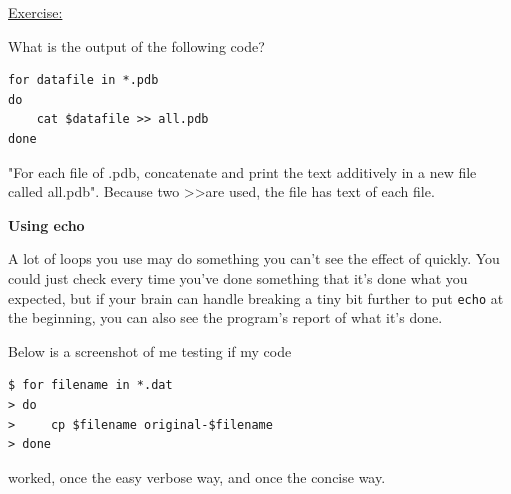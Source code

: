 \documentclass[12pt]{article}
\begin{document}
\begin{addmargin}[1cm]{0cm}
\color{gray}
\vspace{1em}\underline{Exercise:}

What is the output of the following code?
\vspace{-1em}\begin{verbatim}
for datafile in *.pdb
do
    cat $datafile >> all.pdb
done
\end{verbatim}\vspace{-0.5em}

\color{black}
"For each file of .pdb, concatenate and print the text additively in a new file called all.pdb". Because two \textgreater\textgreater are used, the file has text of each file. 
\end{addmargin}

\textbf{Using echo}

A lot of loops you use may do something you can't see the effect of quickly. You could just check every time you've done something that it's done what you expected, but if your brain can handle breaking a tiny bit further to put \texttt{echo} at the beginning, you can also see the program's report of what it's done. 

Below is a screenshot of me testing if my code
\vspace{-1em}\begin{verbatim}
$ for filename in *.dat
> do
>     cp $filename original-$filename
> done
\end{verbatim}\vspace{-1em}
worked, once the easy verbose way, and once the concise way.
\end{document}
